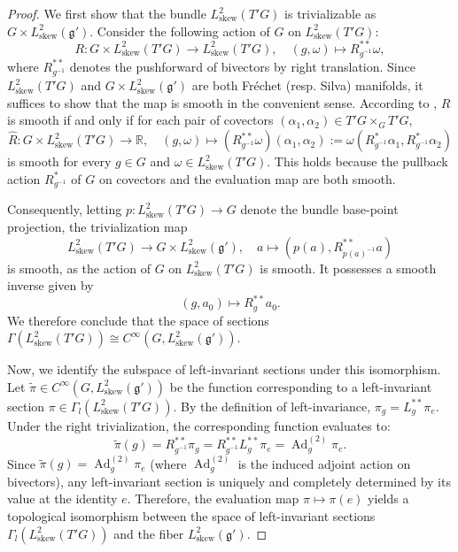 \documentclass[11pt,reqno]{amsart}
\theoremstyle{definition}
\numberwithin{equation}{section}
\begin{document}
\begin{proof}
We first show that the bundle $L^2_{\text{skew}}(T'G)$ is trivializable as $G \times L^2_{\text{skew}}(\mathfrak{g}').$ Consider the following action of $G$ on $L^2_{\text{skew}}(T'G)$:
\[
R : G \times L^2_{\text{skew}}(T'G) \rightarrow L^2_{\text{skew}}(T'G), \quad (g, \omega) \mapsto R_{g^{-1}}^{**}\omega,
\] 
where $R_{g^{-1}}^{**}$ denotes the pushforward of bivectors by right translation. Since $L^2_{\text{skew}}(T'G)$ and $G \times L^2_{\text{skew}}(\mathfrak{g}')$ are both Fréchet (resp. Silva) manifolds, it suffices to show that the map is smooth in the convenient sense. According to \cite[Theorem 5.19]{20}, $R$ is smooth if and only if for each pair of covectors $(\alpha_1, \alpha_2) \in T'G \times_G T'G$, 
\[ 
\hat{R} : G \times L^2_{\text{skew}}(T'G) \rightarrow \mathbb{R}, \quad (g, \omega) \mapsto (R_{g^{-1}}^{**}\omega)(\alpha_1, \alpha_2) := \omega(R_{g^{-1}}^*\alpha_1, R_{g^{-1}}^*\alpha_2) 
\] 
is smooth for every $g \in G$ and $\omega \in L^2_{\text{skew}}(T'G)$. This holds because the pullback action $R_{g^{-1}}^*$ of $G$ on covectors and the evaluation map are both smooth.

Consequently, letting $p: L^2_{\text{skew}}(T'G) \to G$ denote the bundle base-point projection, the trivialization map 
\[
L^2_{\text{skew}}(T'G) \rightarrow G \times L^2_{\text{skew}}(\mathfrak{g}'), \quad a \mapsto (p(a), R_{p(a)^{-1}}^{**}a)
\] 
is smooth, as the action of $G$ on $L^2_{\text{skew}}(T'G)$ is smooth. It possesses a smooth inverse given by
\[
(g, a_0) \mapsto R_g^{**}a_0.
\] 
We therefore conclude that the space of sections $\Gamma(L^2_{\text{skew}}(T'G)) \cong C^{\infty}(G, L^2_{\text{skew}}(\mathfrak{g}')).$ 

Now, we identify the subspace of left-invariant sections under this isomorphism. Let $\tilde{\pi} \in C^{\infty}(G, L^2_{\text{skew}}(\mathfrak{g}'))$ be the function corresponding to a left-invariant section $\pi \in \Gamma_l(L^2_{\text{skew}}(T'G))$. By the definition of left-invariance, $\pi_g = L_g^{**} \pi_e$. Under the right trivialization, the corresponding function evaluates to:
\[
\tilde{\pi}(g) = R_{g^{-1}}^{**} \pi_g = R_{g^{-1}}^{**} L_g^{**} \pi_e = \operatorname{Ad}^{(2)}_g \pi_e.
\]
Since $\tilde{\pi}(g) = \operatorname{Ad}^{(2)}_g \pi_e$ (where $\operatorname{Ad}^{(2)}_g$ is the induced adjoint action on bivectors), any left-invariant section is uniquely and completely determined by its value at the identity $e$. Therefore, the evaluation map $\pi \mapsto \pi(e)$ yields a topological isomorphism between the space of left-invariant sections $\Gamma_l(L^2_{\text{skew}}(T'G))$ and the fiber $L^2_{\text{skew}}(\mathfrak{g}').$
\end{proof}
\end{document}
